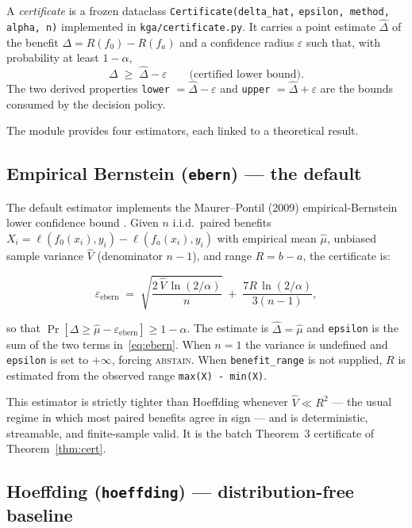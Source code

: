 A \emph{certificate} is a frozen dataclass \texttt{Certificate(delta\_hat,}
\texttt{epsilon, method, alpha, n)} implemented in \texttt{kga/certificate.py}.
It carries a point estimate $\widehat\Delta$ of the benefit
$\Delta = R(f_0) - R(f_a)$ and a confidence radius $\varepsilon$ such that, with
probability at least $1 - \alpha$,
\[
  \Delta \;\geq\; \widehat\Delta - \varepsilon \qquad \text{(certified lower bound)}.
\]
The two derived properties \texttt{lower} $= \widehat\Delta - \varepsilon$ and
\texttt{upper} $= \widehat\Delta + \varepsilon$ are the bounds consumed by the
decision policy.

The module provides four estimators, each linked to a theoretical result.

\subsection{Empirical Bernstein (\texttt{ebern}) --- the default}
\label{sec:kga-ebern}

The default estimator implements the Maurer--Pontil (2009) empirical-Bernstein
lower confidence bound \cite{maurer2009empirical}.  Given $n$ i.i.d.\ paired
benefits $X_i = \ell(f_0(x_i), y_i) - \ell(f_a(x_i), y_i)$ with empirical
mean $\widehat\mu$, unbiased sample variance $\widehat{V}$ (denominator $n-1$),
and range $R = b - a$, the certificate is:

\begin{equation}
  \varepsilon_{\mathrm{ebern}} \;=\;
  \sqrt{\frac{2\,\widehat{V}\,\ln(2/\alpha)}{n}}
  \;+\;
  \frac{7R\,\ln(2/\alpha)}{3(n-1)},
  \label{eq:ebern}
\end{equation}

so that $\Pr[\Delta \geq \widehat\mu - \varepsilon_{\mathrm{ebern}}] \geq 1 -
\alpha$.  The estimate is $\widehat\Delta = \widehat\mu$ and \texttt{epsilon} is
the sum of the two terms in~\eqref{eq:ebern}.  When $n = 1$ the variance is
undefined and \texttt{epsilon} is set to $+\infty$, forcing \textsc{abstain}.
When \texttt{benefit\_range} is not supplied, $R$ is estimated from the observed
range \texttt{max(X) - min(X)}.

This estimator is strictly tighter than Hoeffding whenever $\widehat{V} \ll R^2$
--- the usual regime in which most paired benefits agree in sign --- and is
deterministic, streamable, and finite-sample valid.  It is the batch Theorem~3
certificate of Theorem~\ref{thm:cert}.

\subsection{Hoeffding (\texttt{hoeffding}) --- distribution-free baseline}
\label{sec:kga-hoeffding}

